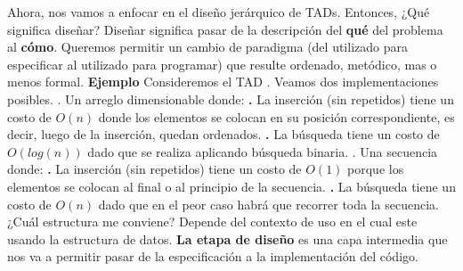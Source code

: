 \documentclass[10pt,a4paper]{article}
\begin{document}
Ahora, nos vamos a enfocar en el diseño jerárquico de TADs.
\newline
\newline
Entonces, ¿Qué significa diseñar?
\newline
\newline
Diseñar significa pasar de la descripción del \textbf{qué} del problema al \textbf{cómo}.
\newline
\newline
Queremos permitir un cambio de paradigma (del utilizado para especificar al utilizado para programar) que resulte ordenado, metódico, mas o menos formal.
\newline
\newline
\textbf{Ejemplo}
\newline
\newline
Consideremos el TAD .
\newline
\newline
Veamos dos implementaciones posibles.
\newline
{}. Un arreglo dimensionable donde:
\newline
\newline
\textbf{.} La inserción (sin repetidos) tiene un costo de $O(n)$ donde los elementos se colocan en su posición correspondiente, es decir, luego de la inserción, quedan ordenados.
\newline
\newline
\textbf{.} La búsqueda tiene un costo de $O(log(n))$ dado que se realiza aplicando búsqueda binaria.
\newline
{}. Una secuencia donde:
\newline
\newline
\textbf{.} La inserción (sin repetidos) tiene un costo de $O(1)$ porque los elementos se colocan al final o al principio de la secuencia.
\newline
\newline
\textbf{.} La búsqueda tiene un costo de $O(n)$ dado que en el peor caso habrá que recorrer toda la secuencia.
\newline
\newline
¿Cuál estructura me conviene?
\newline
\newline
Depende del contexto de uso en el cual este usando la estructura de datos.
\newline
\newline
\textbf{La etapa de diseño} es una capa intermedia que nos va a permitir pasar de la especificación a la implementación del código.
\end{document}
